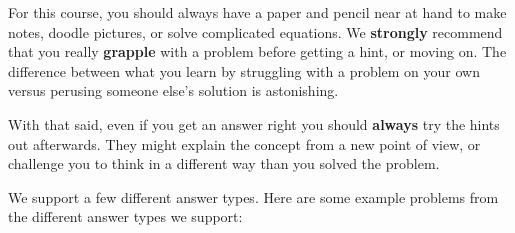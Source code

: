 \documentclass{ximera}
\begin{document}
For this course, you should always have a paper and pencil near at
hand to make notes, doodle pictures, or solve complicated equations.
We \textbf{strongly} recommend that you really \textbf{grapple} with a
problem before getting a hint, or moving on.  The difference between
what you learn by struggling with a problem on your own versus
perusing someone else's solution is astonishing.

With that said, even if you get an answer right you should
\textbf{always} try the hints out afterwards.  They might explain the
concept from a new point of view, or challenge you to think in a
different way than you solved the problem.


We support a few different answer types. Here are some example
problems from the different answer types we support:

\end{document}
